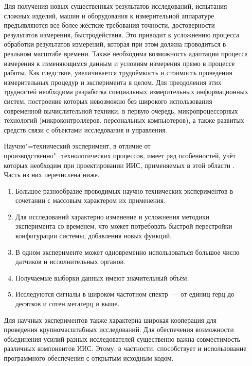 \documentclass[a4paper, 14pt, titlepage]{extarticle}
\begin{document}
  Для получения новых существенных результатов исследований, испытания сложных изделий, машин и
  оборудования к измерительной аппаратуре предъявляются все более жёсткие требования
  точности, достоверности результатов измерения, быстродействия. Это приводит к усложнению
  процесса обработки результатов измерений, которая при этом должна проводиться в реальном масштабе
  времени. Также необходима возможность адаптации процесса измерения к изменяющимся данным и условиям
  измерения прямо в процессе работы. Как следствие, увеличивается трудоёмкость и стоимость
  проведения измерительных процедур и эксперимента в целом. Для преодоления этих трудностей
  необходима разработка специальных измерительных информационных систем, построение которых
  невозможно без широкого использования современной вычислительной техники, в первую очередь,
  микропроцессорных технологий (микроконтроллеров, персональных компьютеров), а также развитых
  средств связи с объектами исследования и управления.

  Научно"=технический эксперимент, в отличие от производственно"=технологических процессов, имеет ряд
  особенностей, учёт которых необходим при проектировании ИИС, применяемых в этой области \cite[с.~17]{rannev-iis}.
  Часть из них перечислена ниже.
  \begin{enumerate}
    \item Большое разнообразие проводимых научно-технических экспериментов в сочетании с массовым
      характером их применения.
    \item Для исследований характерно изменение и усложнения методики эксперимента со временем,
      что может потребовать быстрой перестройки конфигурации системы, добавления новых функций.
    \item В одном эксперименте может одновременно использоваться большое число датчиков и
      исполнительных органов.
    \item Получаемые выборки данных имеют значительный объём.
    \item Исследуются сигналы в широком частотном спектр~--- от единиц герц до десятков и сотен
      мегагерц и выше.
  \end{enumerate}
  Для научных экспериментов также характерна широкая кооперация для проведения крупномасштабных
  исследований. Для обеспечения возможности объединения усилий разных исследователей существенно
  важна совместимость различных компонентов ИИС. Этому, в частности, способствует и использование
  программного обеспечения с открытым исходным кодом.
\end{document}
